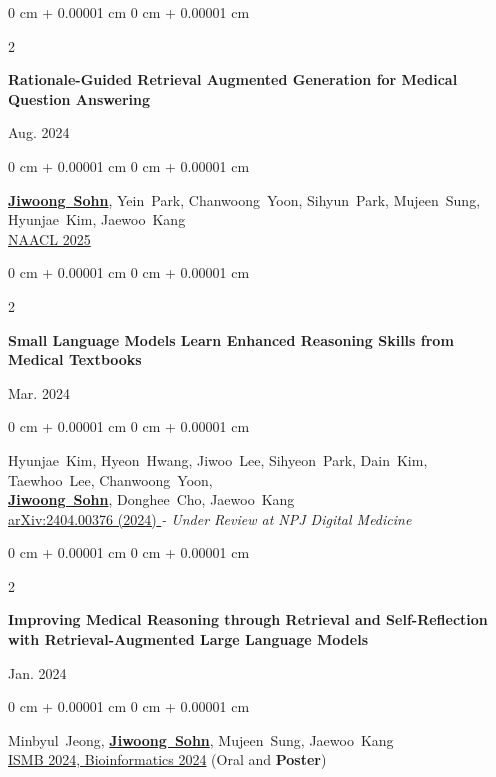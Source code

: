 \documentclass[10pt, letterpaper]{article}
\newenvironment{onecolentry}{
    \begin{adjustwidth}{
        0 cm + 0.00001 cm
    }{
        0 cm + 0.00001 cm
    }
}{
    \end{adjustwidth}
} %
\newenvironment{twocolentry}[2][]{
    \onecolentry
    \def\secondColumn{#2}
    \setcolumnwidth{\fill, 3.5 cm}
    \begin{paracol}{2}
}{
    \switchcolumn \raggedleft \secondColumn
    \end{paracol}
    \endonecolentry
} %
\begin{document}
       \begin{twocolentry}
            {
                Aug. 2024
            }
            {
                \textbf{Rationale-Guided Retrieval Augmented Generation for Medical Question Answering}
            }         
        \end{twocolentry}            
        \begin{onecolentry}
                \mbox{\textbf{\underline{Jiwoong Sohn}}}, \mbox{Yein Park},
                \mbox{Chanwoong Yoon}, \mbox{Sihyun Park},
                \mbox{Mujeen Sung}, \mbox{Hyunjae Kim}, \mbox{Jaewoo Kang} \\
        \href{https://arxiv.org/abs/2411.00300} {{NAACL 2025}}   
        \end{onecolentry}
    \vspace{0.3 cm}

       \begin{twocolentry}
            {
                Mar. 2024
            }
            {
                \textbf{Small Language Models Learn Enhanced Reasoning Skills from Medical Textbooks}
            } 
        \end{twocolentry}            
        \begin{onecolentry}
                \mbox{Hyunjae Kim}, \mbox{Hyeon Hwang},
                \mbox{Jiwoo Lee}, \mbox{Sihyeon Park},
                \mbox{Dain Kim}, \mbox{Taewhoo Lee},
                \mbox{Chanwoong Yoon}, \\
                \mbox{\textbf{\underline{Jiwoong Sohn}}}, \mbox{Donghee Cho}, \mbox{Jaewoo Kang} \\
        \href{https://arxiv.org/abs/2404.00376} {{arXiv:2404.00376 (2024)} } \textit{- Under Review at NPJ Digital Medicine}
        \end{onecolentry}
    \vspace{0.3 cm}
    
       \begin{twocolentry}
            {
                Jan. 2024
            }
            {
                \textbf{Improving Medical Reasoning through Retrieval and Self-Reflection with Retrieval-Augmented Large Language Models}
            }
        \end{twocolentry}           
        \begin{onecolentry}
                \mbox{Minbyul Jeong},
                \mbox{\textbf{\underline{Jiwoong Sohn}}}, \mbox{Mujeen Sung}, \mbox{Jaewoo Kang} \\
        \href{https://academic.oup.com/bioinformatics/article/40/Supplement_1/i119/7700892} {{ISMB 2024, Bioinformatics 2024}} 
        (Oral and \textbf{Poster})
    \end{onecolentry}
    \vspace{0.3 cm}
    
\end{document}

